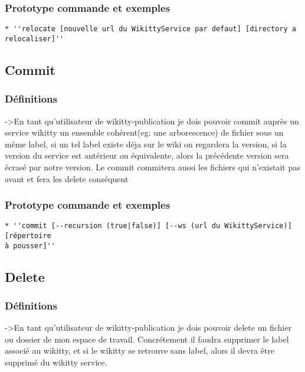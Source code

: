 \documentclass{article}
\begin{document}
\subsubsection{Prototype commande et exemples}

\begin{verbatim}
* ''relocate [nouvelle url du WikittyService par defaut] [directory a
relocaliser]''
\end{verbatim}

\subsection{Commit}
\subsubsection{Définitions}
->En tant qu'utilisateur de wikitty-publication je dois pouvoir 
commit auprès un service wikitty un ensemble cohérent(eg: une arborescence)
de fichier sous un même label, si un tel label existe déja sur le wiki on 
regardera la version, si la version du service est antérieur ou équivalente, alors
la précédente version sera écrasé par notre version.
Le commit commitera aussi les fichiers qui n'existait pas avant et fera les 
delete conséquent

\subsubsection{Prototype commande et exemples}

\begin{verbatim}
* ''commit [--recursion (true|false)] [--ws (url du WikittyService)] [répertoire
à pousser]''
\end{verbatim}



\subsection{Delete}
\subsubsection{Définitions}

->En tant qu'utilisateur de wikitty-publication je dois pouvoir delete 
un fichier ou dossier de mon espace de travail. Concrétement il faudra supprimer le label associé 
au wikitty, et si le wikitty se retrouve sans label, alors il devra être supprimé 
du wikitty service.
\end{document}
